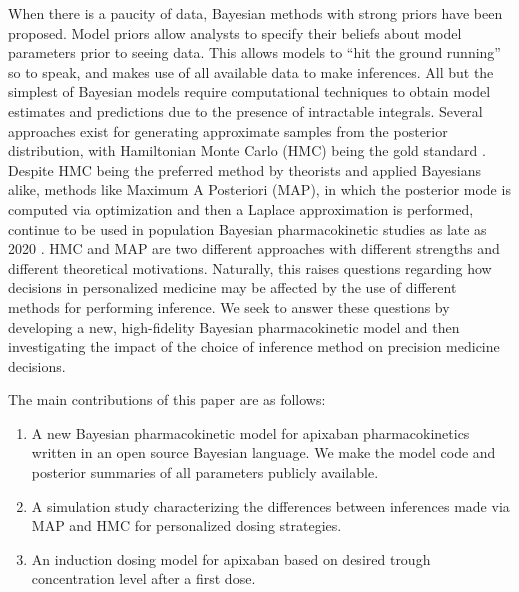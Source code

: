 When there is a paucity of data, Bayesian methods with strong priors have been proposed.  Model priors allow analysts to specify their beliefs about model parameters prior to seeing data.  This allows models to ``hit the ground running'' so to speak, and makes use of all available data to make inferences.  All but the simplest of Bayesian models require computational techniques to obtain model estimates and predictions due to the presence of intractable integrals. Several approaches exist for generating approximate samples from the posterior distribution, with Hamiltonian Monte Carlo (HMC) being the gold standard \cite{Neal1996-vn, Matthew_D_Hoffman2014-in, Carpenter2017-qf, Tripuraneni2017-oh}. Despite HMC being the preferred method by theorists and applied Bayesians alike, methods like Maximum A Posteriori (MAP), in which the posterior mode is computed via optimization and then a Laplace approximation is performed, continue to be used in population Bayesian pharmacokinetic studies as late as 2020 \cite{Brooks2016-li, Nguyen2016-pg,  Preijers2019-kc,Stifft2020-uq}. HMC and MAP are two different approaches with different strengths and different theoretical motivations. Naturally, this raises questions regarding how decisions in personalized medicine may be affected by the use of different methods for performing inference. We seek to answer these questions by developing a new, high-fidelity Bayesian pharmacokinetic model and then investigating the impact of the choice of inference method on precision medicine decisions.


The main contributions of this paper are as follows: 

\begin{enumerate}
\item A new Bayesian pharmacokinetic model for apixaban pharmacokinetics written in an open source Bayesian language.  We make the model code and posterior summaries of all parameters publicly available.

\item A simulation study characterizing the differences between inferences made via MAP and HMC for personalized dosing strategies.

\item An induction dosing model for apixaban based on desired trough concentration level after a first dose.
\end{enumerate}




